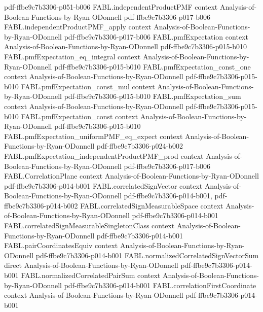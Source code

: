 \begin{theorem}
  {pdf-ffbe9c7b3306-p051-b006}
\proofstep
  {FABL.independentProductPMF}
  {context}
  {Analysis-of-Boolean-Functions-by-Ryan-ODonnell}
  {pdf-ffbe9c7b3306-p017-b006}
\proofstep
  {FABL.independentProductPMF_apply}
  {context}
  {Analysis-of-Boolean-Functions-by-Ryan-ODonnell}
  {pdf-ffbe9c7b3306-p017-b006}
\proofstep
  {FABL.pmfExpectation}
  {context}
  {Analysis-of-Boolean-Functions-by-Ryan-ODonnell}
  {pdf-ffbe9c7b3306-p015-b010}
\proofstep
  {FABL.pmfExpectation_eq_integral}
  {context}
  {Analysis-of-Boolean-Functions-by-Ryan-ODonnell}
  {pdf-ffbe9c7b3306-p015-b010}
\proofstep
  {FABL.pmfExpectation_const_one}
  {context}
  {Analysis-of-Boolean-Functions-by-Ryan-ODonnell}
  {pdf-ffbe9c7b3306-p015-b010}
\proofstep
  {FABL.pmfExpectation_const_mul}
  {context}
  {Analysis-of-Boolean-Functions-by-Ryan-ODonnell}
  {pdf-ffbe9c7b3306-p015-b010}
\proofstep
  {FABL.pmfExpectation_sum}
  {context}
  {Analysis-of-Boolean-Functions-by-Ryan-ODonnell}
  {pdf-ffbe9c7b3306-p015-b010}
\proofstep
  {FABL.pmfExpectation_const}
  {context}
  {Analysis-of-Boolean-Functions-by-Ryan-ODonnell}
  {pdf-ffbe9c7b3306-p015-b010}
\proofstep
  {FABL.pmfExpectation_uniformPMF_eq_expect}
  {context}
  {Analysis-of-Boolean-Functions-by-Ryan-ODonnell}
  {pdf-ffbe9c7b3306-p024-b002}
\proofstep
  {FABL.pmfExpectation_independentProductPMF_prod}
  {context}
  {Analysis-of-Boolean-Functions-by-Ryan-ODonnell}
  {pdf-ffbe9c7b3306-p017-b006}
\proofstep
  {FABL.CorrelationPlane}
  {context}
  {Analysis-of-Boolean-Functions-by-Ryan-ODonnell}
  {pdf-ffbe9c7b3306-p014-b001}
\proofstep
  {FABL.correlatedSignVector}
  {context}
  {Analysis-of-Boolean-Functions-by-Ryan-ODonnell}
  {pdf-ffbe9c7b3306-p014-b001,
    pdf-ffbe9c7b3306-p014-b002}
\proofstep
  {FABL.correlatedSignMeasurableSpace}
  {context}
  {Analysis-of-Boolean-Functions-by-Ryan-ODonnell}
  {pdf-ffbe9c7b3306-p014-b001}
\proofstep
  {FABL.correlatedSignMeasurableSingletonClass}
  {context}
  {Analysis-of-Boolean-Functions-by-Ryan-ODonnell}
  {pdf-ffbe9c7b3306-p014-b001}
\proofstep
  {FABL.pairCoordinatesEquiv}
  {context}
  {Analysis-of-Boolean-Functions-by-Ryan-ODonnell}
  {pdf-ffbe9c7b3306-p014-b001}
\proofstep
  {FABL.normalizedCorrelatedSignVectorSum}
  {direct}
  {Analysis-of-Boolean-Functions-by-Ryan-ODonnell}
  {pdf-ffbe9c7b3306-p014-b001}
\proofstep
  {FABL.normalizedCorrelatedPairSum}
  {context}
  {Analysis-of-Boolean-Functions-by-Ryan-ODonnell}
  {pdf-ffbe9c7b3306-p014-b001}
\proofstep
  {FABL.correlationFirstCoordinate}
  {context}
  {Analysis-of-Boolean-Functions-by-Ryan-ODonnell}
  {pdf-ffbe9c7b3306-p014-b001}
\proofstep

\end{theorem}
